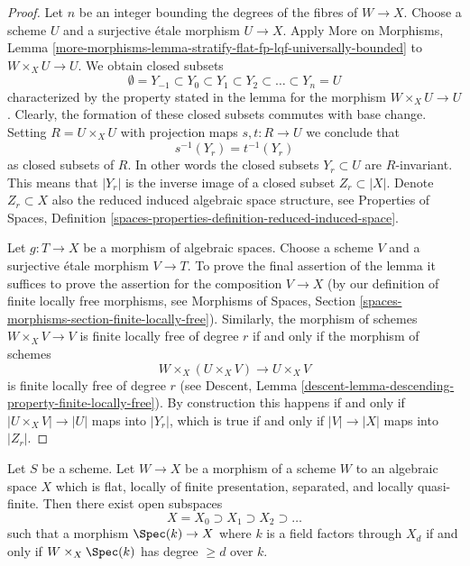 \begin{proof}
Let $n$ be an integer bounding the degrees of the fibres of $W \to X$.
Choose a scheme $U$ and a surjective \'etale morphism $U \to X$.
Apply More on Morphisms, Lemma
\ref{more-morphisms-lemma-stratify-flat-fp-lqf-universally-bounded}
to $W \times_X U \to U$. We obtain closed subsets
$$
\emptyset = Y_{-1} \subset Y_0 \subset Y_1 \subset Y_2 \subset
\ldots \subset Y_n = U
$$
characterized by the property stated in the lemma for the morphism
$W \times_X U \to U$. Clearly, the formation of these closed subsets commutes
with base change. Setting $R = U \times_X U$ with projection maps
$s, t : R \to U$ we conclude that
$$
s^{-1}(Y_r) = t^{-1}(Y_r)
$$
as closed subsets of $R$. In other words the closed subsets $Y_r \subset U$
are $R$-invariant. This means that $|Y_r|$ is the inverse image of a closed
subset $Z_r \subset |X|$. Denote $Z_r \subset X$ also the reduced induced
algebraic space structure, see
Properties of Spaces, Definition
\ref{spaces-properties-definition-reduced-induced-space}.

\medskip\noindent
Let $g : T \to X$ be a morphism of algebraic spaces. Choose a scheme $V$
and a surjective \'etale morphism $V \to T$. To prove the final
assertion of the lemma it suffices to prove the assertion for the composition
$V \to X$ (by our definition of finite locally free morphisms, see
Morphisms of Spaces, Section
\ref{spaces-morphisms-section-finite-locally-free}).
Similarly, the morphism of schemes $W \times_X V \to V$ is finite
locally free of degree $r$ if and only if the morphism of schemes
$$
W \times_X (U \times_X V)
\longrightarrow
U \times_X V
$$
is finite locally free of degree $r$ (see
Descent, Lemma \ref{descent-lemma-descending-property-finite-locally-free}).
By construction this happens if and only if $|U \times_X V| \to |U|$
maps into $|Y_r|$, which is true if and only if $|V| \to |X|$ maps
into $|Z_r|$.
\end{proof}

\begin{lemma}
\label{lemma-stratify-flat-fp-lqf}
Let $S$ be a scheme. Let $W \to X$ be a morphism of a scheme $W$ to an
algebraic space $X$ which is flat, locally of finite presentation,
separated, and locally quasi-finite. Then there
exist open subspaces
$$
X = X_0 \supset X_1 \supset X_2 \supset \ldots
$$
such that a morphism $\Spec(k) \to X$ where $k$ is a field
factors through $X_d$ if and
only if $W \times_X \Spec(k)$ has degree $\geq d$ over $k$.
\end{lemma}

